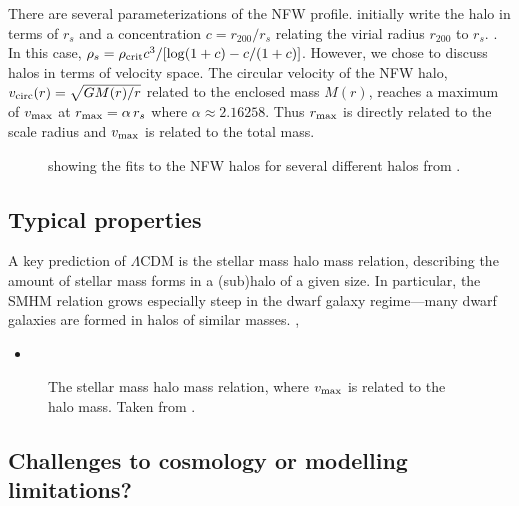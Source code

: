 There are several parameterizations of the NFW profile. \citet{NFW1996}
initially write the halo in terms of \(r_s\) and a concentration
\(c= r_{200} / r_s\) relating the virial radius \(r_{200}\) to \(r_s\).
. In this case,
\(\rho_s = \rho_{\rm crit} c^3 / [\log(1+c) - c/(1+c)]\). However, we
chose to discuss halos in terms of velocity space. The circular velocity
of the NFW halo, \(v_{\rm circ}(r) = \sqrt{G M(r) / r}\) related to the
enclosed mass \(M(r)\), reaches a maximum of \(v_{\rm max}\) at
\(r_{\rm max} = \alpha\,r_s\) where \(\alpha\approx2.16258\). Thus
\(r_{\rm max}\) is directly related to the scale radius and
\(v_{\rm max}\) is related to the total mass.

\begin{figure}
\centering
{}
\caption[The NFW density profile]{showing the fits to the NFW halos for
several different halos from \citet{NFW1996}.}
\end{figure}

\subsection{Typical properties}\label{typical-properties}

A key prediction of \(\Lambda\)CDM is the stellar mass halo mass
relation, describing the amount of stellar mass forms in a (sub)halo of
a given size. In particular, the SMHM relation grows especially steep in
the dwarf galaxy regime---many dwarf galaxies are formed in halos of
similar masses. \citet{fattahi+2013}, \citet{fattahi+2018}

\begin{itemize}
\tightlist
\item
  \citet{battaglia+nipoti2022}
\end{itemize}

\begin{figure}
\centering
{}
\caption[stellar mass halo mass relation]{The stellar mass halo mass
relation, where \(v_{\rm max}\) is related to the halo mass. Taken from
\citet{fattahi2018}.}
\end{figure}

\subsection{Challenges to cosmology or modelling
limitations?}\label{challenges-to-cosmology-or-modelling-limitations}

